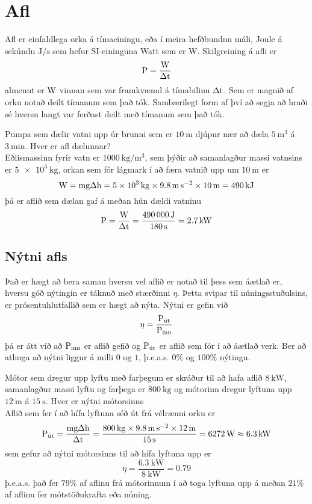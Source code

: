 \section{Afl}
Afl er einfaldlega orka á tímaeiningu, eða í meira hefðbundnu máli, Joule á sekúndu
$\si{\J\per\s}$ sem hefur SI-eininguna Watt sem er $\si{\W}$. 
Skilgreining á afli er
\begin{equation}
	\textrm{P} = \frac{\textrm{W}}{\Delta\textrm{t}}
\end{equation}
almennt er $\textrm{W}$ vinnan sem var framkvæmd á tímabilinu $\Delta\textrm{t}$. Sem
er magnið af orku notað deilt tímanum sem það tók. Sambærilegt form af því að segja
að hraði sé hversu langt var ferðast deilt með tímanum sem það tók.
%
\begin{formalexample}
Pumpa sem dælir vatni upp úr brunni sem er $\SI{10}{\m}$ djúpur nær að dæla $\SI{5}{\m\cubed}$
á $\SI{3}{\minute}$. Hver er afl dælunnar?
\\[4 ex]
Eðlismassinn fyrir vatn er $\SI{1000}{\kg\per\m\cubed}$, sem þýðir að samanlagður massi
vatnsins er $\SI{5e3}{\kg}$, orkan sem fór lágmark í að færa vatnið upp um $\SI{10}{\m}$
er
\[
	\uworkw = \umass \uacceleg \Delta\ulengthh
		= \SI{5e3}{\kg} \times \SI{9.8}{\m\per\s\squared} \times \SI{10}{\m}
		= \SI{490}{\kJ}
\]
þá er aflið sem dælan gaf á meðan hún dældi vatninu
\[
	\upower = \frac{\uworkw}{\Delta\utime}
		= \frac{ \SI{490000}{\J} }{ \SI{180}{\s} }
		= \SI{2.7}{\kW}
\]
\end{formalexample}


\subsection{Nýtni afls}
Það er hægt að bera saman hversu vel aflið er notað til þess sem áætlað er, hversu góð
nýtingin er táknuð með stærðinni $\eta$. Þetta svipar til núningsstuðulsins, er 
prósentuhlutfallið sem er hægt að nýta. Nýtni er gefin við
\begin{equation}
	\eta = \frac{\textrm{P}_\text{út}}{\textrm{P}_\text{inn}}
\end{equation}
þá er átt við að $\textrm{P}_\text{inn}$ er aflið gefið og $\textrm{P}_\text{út}$ er aflið sem
fór í að áætlað verk. Ber að athuga að nýtni liggur á milli $0$ og $1$, þ.e.a.s. $0 \%$ og
$100\%$ nýtingu.

\begin{formalexample}
Mótor sem dregur upp lyftu með farþegum er skráður til að hafa aflið $\SI{8}{\kW}$,
samanlagður massi lyftu og farþega er $\SI{800}{\kg}$ og mótorinn dregur lyftuna upp
$\SI{12}{\m}$ á $\SI{15}{\s}$. Hver er nýtni mótorsinns
\\[4 ex]
Aflið sem fer í að hífa lyftuna séð út frá vélrænni orku er
\[
	\upower_\text{út} 
		= \frac{\umass \uacceleg \Delta\ulengthh}{\Delta\utime}
		= \frac{ \SI{800}{\kg} \times \SI{9.8}{\m\per\s\squared}
			\times \SI{12}{\m} }{ \SI{15}{\s} }
		= \SI{6272}{\W} \approx \SI{6.3}{\kW}
\]
sem gefur að nýtni mótorsinns til að hífa lyftuna upp er
\[
	\eta = \frac{ \SI{6.3}{\kW} }{ \SI{8}{\kW} } 
		= \num{0.79}
\]
þ.e.a.s. það fer $79\%$ af aflinu frá mótorinnum í að toga lyftuna upp á meðan $21 \%$ af aflinu
fer mótstöðukrafta eða núning.
\end{formalexample}
